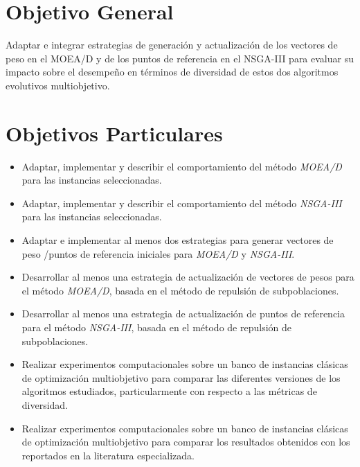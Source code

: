 \documentclass[letterpaper,10pt]{article}
\begin{document}
\section{Objetivo General}

Adaptar e integrar estrategias de generación y actualización de los vectores de peso en el MOEA/D y de los puntos de referencia en el NSGA-III para  evaluar su impacto sobre el desempeño en términos de diversidad de estos dos algoritmos evolutivos multiobjetivo.

\section{Objetivos Particulares}

\begin{itemize}

\item Adaptar, implementar y describir el comportamiento del método \emph{MOEA/D} para las instancias seleccionadas.
 
\item Adaptar, implementar y describir el comportamiento del método \emph{NSGA-III} para las instancias seleccionadas.

\item Adaptar e implementar al menos dos estrategias para generar vectores de peso /puntos de referencia iniciales para \emph{MOEA/D} y \emph{NSGA-III}.

\item Desarrollar al menos una estrategia de actualización de vectores de pesos para el método \emph{MOEA/D}, basada en el método de repulsión de subpoblaciones\cite{ahrari2016multimodal}.

\item Desarrollar al menos una estrategia de actualización de puntos de referencia para el método \emph{NSGA-III}, basada en el método de repulsión de subpoblaciones\cite{ahrari2016multimodal}.

\item Realizar experimentos computacionales sobre un banco de instancias clásicas de optimización multiobjetivo\cite{zhang2008multiobjective} para comparar las diferentes versiones de los algoritmos estudiados, particularmente con respecto a las métricas de diversidad.

\item Realizar experimentos computacionales sobre un banco de instancias clásicas de optimización multiobjetivo\cite{zhang2008multiobjective} para comparar los resultados obtenidos con los reportados en la literatura especializada.  

\end{itemize}
\end{document}

